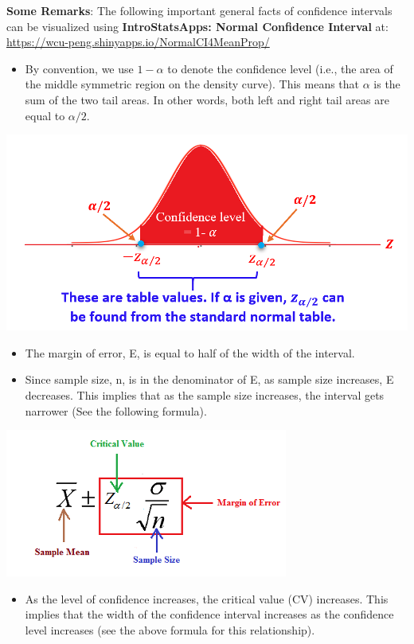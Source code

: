 \documentclass[
]{book}
\providecommand{\tightlist}{%
  \setlength{\itemsep}{0pt}\setlength{\parskip}{0pt}}
\begin{document}
\hfill\break

\textbf{Some Remarks}: The following important general facts of confidence intervals can be visualized using \textbf{IntroStatsApps: Normal Confidence Interval} at: \url{https://wcu-peng.shinyapps.io/NormalCI4MeanProp/}

\begin{itemize}
\tightlist
\item
  By convention, we use \(1 - \alpha\) to denote the confidence level (i.e., the area of the middle symmetric region on the density curve). This means that \(\alpha\) is the sum of the two tail areas. In other words, both left and right tail areas are equal to \(\alpha / 2\).
\end{itemize}

\begin{center}\includegraphics[width=0.6\linewidth]{week06/confLevel} \end{center}

\begin{itemize}
\item
  The margin of error, E, is equal to half of the width of the interval.
\item
  Since sample size, n, is in the denominator of E, as sample size increases, E decreases. This implies that as the sample size increases, the interval gets narrower (See the following formula).
\end{itemize}

\begin{center}\includegraphics[width=0.6\linewidth]{week06/ciFormula} \end{center}

\begin{itemize}
\tightlist
\item
  As the level of confidence increases, the critical value (CV) increases. This implies that the width of the confidence interval increases as the confidence level increases (see the above formula for this relationship).
\end{itemize}
\end{document}

